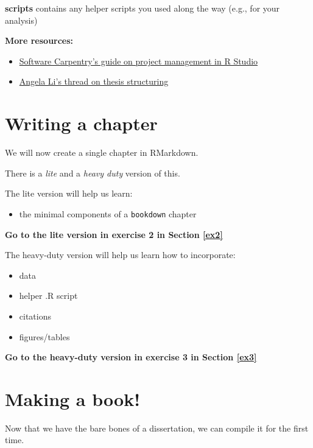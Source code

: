 \documentclass[
  12pt,
  oneside]{book}
\providecommand{\tightlist}{%
  \setlength{\itemsep}{0pt}\setlength{\parskip}{0pt}}
\numberwithin{figure}{chapter}
\begin{document}
\textbf{scripts} contains any helper scripts you used along the way (e.g., for your analysis)

\textbf{More resources:}

\begin{itemize}
\tightlist
\item
  \href{https://swcarpentry.github.io/r-novice-gapminder/02-project-intro/}{Software Carpentry's guide on project management in R Studio}
\item
  \href{https://twitter.com/CivicAngela/status/1024469727274565633}{Angela Li's thread on thesis structuring}
\end{itemize}

\hypertarget{writing-a-chapter}{%
\section{Writing a chapter}\label{writing-a-chapter}}

We will now create a single chapter in RMarkdown.

There is a \emph{lite} and a \emph{heavy duty} version of this.

The lite version will help us learn:

\begin{itemize}
\tightlist
\item
  the minimal components of a \texttt{bookdown} chapter
\end{itemize}

\textbf{Go to the lite version in exercise 2 in Section \ref{ex2}}

The heavy-duty version will help us learn how to incorporate:

\begin{itemize}
\tightlist
\item
  data
\item
  helper .R script
\item
  citations
\item
  figures/tables
\end{itemize}

\textbf{Go to the heavy-duty version in exercise 3 in Section \ref{ex3}}

\hypertarget{making-a-book}{%
\section{Making a book!}\label{making-a-book}}

Now that we have the bare bones of a dissertation, we can compile it for the first time.
\end{document}
